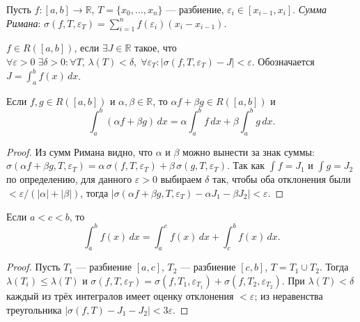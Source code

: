 
\begin{defn}
  Пусть $f: [a,b] \to \mathbb{R}$, $T = \{x_0,\ldots,x_n\}$ --- разбиение, $\varepsilon_i \in [x_{i-1}, x_i]$.
  \emph{Сумма Римана}:
  $\sigma(f, T, \varepsilon_T) = \sum_{i=1}^n f(\varepsilon_i)(x_i - x_{i-1})$.
\end{defn}

\begin{defn}
  $f \in R([a,b])$, если $\exists J \in \mathbb{R}$ такое, что
  $\forall\varepsilon>0\;\exists\delta>0: \forall T,\,\lambda(T)<\delta,\;\forall\varepsilon_T:
  |\sigma(f,T,\varepsilon_T) - J| < \varepsilon$.
  Обозначается $J = \int_a^b f(x)\,dx$.
\end{defn}

\begin{theorem}[Линейность]
  Если $f, g \in R([a,b])$ и $\alpha,\beta \in \mathbb{R}$, то $\alpha f + \beta g \in R([a,b])$ и
  \[
    \int_a^b (\alpha f + \beta g)\,dx = \alpha \int_a^b f\,dx + \beta \int_a^b g\,dx.
  \]
  \begin{proof}
    Из сумм Римана видно, что $\alpha$ и $\beta$ можно вынести за знак суммы:
    $\sigma(\alpha f + \beta g, T, \varepsilon_T) = \alpha\,\sigma(f,T,\varepsilon_T) + \beta\,\sigma(g,T,\varepsilon_T)$.
    Так как $\int f = J_1$ и $\int g = J_2$ по определению,
    для данного $\varepsilon > 0$ выбираем $\delta$ так, чтобы оба отклонения были $< \varepsilon / (|\alpha|+|\beta|)$,
    тогда $|\sigma(\alpha f+\beta g,T,\varepsilon_T) - \alpha J_1 - \beta J_2| < \varepsilon$. \qedhere
  \end{proof}
\end{theorem}

\begin{theorem}[Аддитивность]
  Если $a < c < b$, то
  \[
    \int_a^b f(x)\,dx = \int_a^c f(x)\,dx + \int_c^b f(x)\,dx.
  \]
  \begin{proof}
    Пусть $T_1$ --- разбиение $[a,c]$, $T_2$ --- разбиение $[c,b]$, $T = T_1 \cup T_2$.
    Тогда $\lambda(T_i) \leq \lambda(T)$ и
    $\sigma(f, T, \varepsilon_T) = \sigma(f, T_1, \varepsilon_{T_1}) + \sigma(f, T_2, \varepsilon_{T_2})$.
    При $\lambda(T) < \delta$ каждый из трёх интегралов имеет оценку отклонения $< \varepsilon$;
    из неравенства треугольника $|\sigma(f,T) - J_1 - J_2| < 3\varepsilon$. \qedhere
  \end{proof}
\end{theorem}
